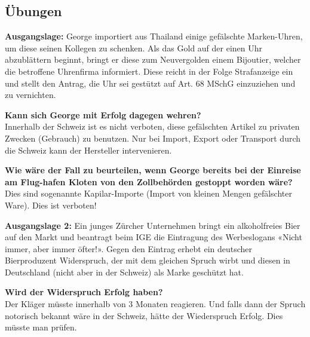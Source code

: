 \hypertarget{uxfcbungen}{%
\subsection{Übungen}\label{uxfcbungen}}

\textbf{Ausgangslage:} George importiert aus Thailand einige gefälschte
Marken-Uhren, um diese seinen Kollegen zu schenken. Als das Gold auf der
einen Uhr abzublättern beginnt, bringt er diese zum Neuvergolden einem
Bijoutier, welcher die betroffene Uhrenfirma informiert. Diese reicht in
der Folge Strafanzeige ein und stellt den Antrag, die Uhr sei gestützt
auf Art. 68 MSchG einzuziehen und zu vernichten.

\textbf{Kann sich George mit Erfolg dagegen wehren?}\\
Innerhalb der Schweiz ist es nicht verboten, diese gefälschten Artikel
zu privaten Zwecken (Gebrauch) zu benutzen. Nur bei Import, Export oder
Transport durch die Schweiz kann der Hersteller intervenieren.

\textbf{Wie wäre der Fall zu beurteilen, wenn George bereits bei der
Einreise am Flug-hafen Kloten von den Zollbehörden gestoppt worden
wäre?}\\
Dies sind sogenannte Kapilar-Importe (Import von kleinen Mengen
gefälschter Ware). Dies ist verboten!

\textbf{Ausgangslage 2:} Ein junges Zürcher Unternehmen bringt ein
alkoholfreies Bier auf den Markt und beantragt beim IGE die Eintragung
des Werbeslogans «Nicht immer, aber immer öfter!». Gegen den Eintrag
erhebt ein deutscher Bierproduzent Widerspruch, der mit dem gleichen
Spruch wirbt und diesen in Deutschland (nicht aber in der Schweiz) als
Marke geschützt hat.

\textbf{Wird der Widerspruch Erfolg haben?}\\
Der Kläger müsste innerhalb von 3 Monaten reagieren. Und falls dann der
Spruch notorisch bekannt wäre in der Schweiz, hätte der Wiederspruch
Erfolg. Dies müsste man prüfen.

